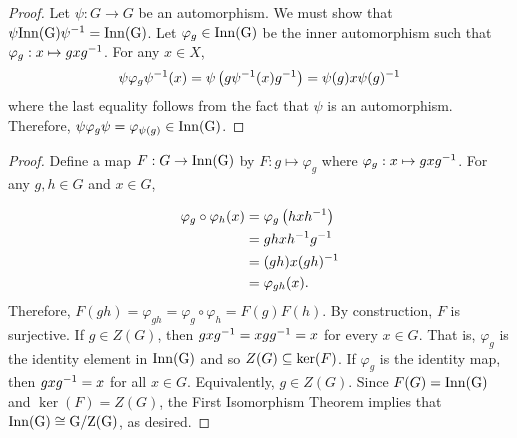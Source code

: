 \documentclass[../../AlgebraQualSolutions.tex]{subfiles}
\begin{document}
\begin{proof}
    Let $\psi: G\to G$ be an automorphism. We must show that $\psi \rm{Inn}(G) \psi^{-1} = \rm{Inn}(G)$. Let $\varphi_g \in \rm{Inn}(G)$ be the inner automorphism such that $\varphi_g: x \mapsto gxg^{-1}$. For any $x \in X$,
            \[\psi\varphi_g\psi^{-1}(x) = \psi\left(g\psi^{-1}(x)g^{-1}\right) = \psi(g)x\psi(g)^{-1}\]
    where the last equality follows from the fact that $\psi$ is an automorphism. Therefore, $\psi\varphi_g\psi = \varphi_{\psi(g)} \in \rm{Inn}(G)$.
\end{proof}

\begin{proof}
    Define a map $F: G \to \rm{Inn}(G)$ by $F: g \mapsto \varphi_g$ where $\varphi_g: x \mapsto gxg^{-1}$. For any $g,h \in G$ and $x \in G$,

        \begin{align*}
            \varphi_g\circ\varphi_h(x) &= \varphi_g\left(hxh^{-1}\right)\\
            &= ghxh^{-1} g^{-1}\\
            &= (gh)x(gh)^{-1}\\
            &= \varphi_{gh}(x).
        \end{align*}
    Therefore, $F(gh) = \varphi_{gh} = \varphi_g\circ \varphi_h = F(g)F(h)$. By construction, $F$ is surjective. If $g \in Z(G)$, then $gxg^{-1} = xgg^{-1} = x$ for every $x \in G$. That is, $\varphi_g$ is the identity element in $\rm{Inn}(G)$ and so $Z(G) \subseteq \ker(F)$. If $\varphi_g$ is the identity map, then $gxg^{-1} = x$ for all $x \in G$. Equivalently, $g \in Z(G)$. Since $F(G) = \rm{Inn}(G)$ and $\ker(F) = Z(G)$, the First Isomorphism Theorem implies that $\rm{Inn}(G) \cong G/Z(G)$, as desired.
\end{proof}
\end{document}
